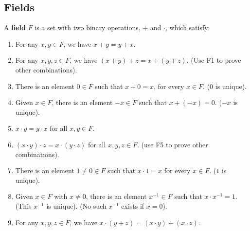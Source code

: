 
\subsection{Fields}

\begin{definition}
	A {\bfseries field} $F$ is a set with two binary operations, $+$ and $\cdot$, 
	which satisfy:


	\begin{enumerate}[label={\bfseries F\theenumi.}]
		\item For any $x,y \in F$, we have $x+y=y+x$.

		\item For any $x,y,z \in F$, we have $(x+y)+z = x+(y+z)$. (Use F1 to prove 
		other combinations).

		\item There is an element $0 \in F$ such that $x+0=x$, for every $x \in F$.
		(0 is unique).

		\item Given $x \in F$, there is an element $-x \in F$  such that $x+(-x)=0$. 
		($-x$ is unique).

		\item $x \cdot y=y \cdot x$ for all $x,y \in F$. 

		\item $(x \cdot y) \cdot z=x \cdot(y \cdot z)$ for all $x,y,z \in F$. 
		(use  F5 to prove other combinations).

		\item There is an element $1 \neq 0\in F$ such that $x \cdot 1=x$ for 
		every $x \in F$. ($1$ is unique).

		\item Given $x \in F$ with $x \neq 0$, there is an element $x^{-1} \in F$
		such that $x \cdot x^{-1} = 1$. (This $x^{-1}$ is unique). 
		(No such $x^{-1}$ exists if $x=0$).

		\item For any $x,y,z \in F$, we have $x \cdot (y+z)=(x \cdot y) + (x \cdot z)$.
	\end{enumerate}
\end{definition}


